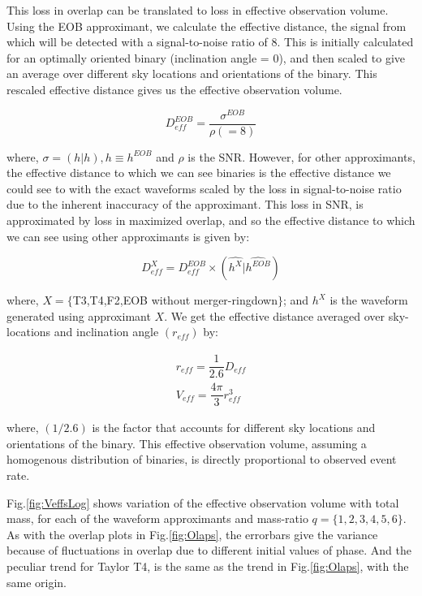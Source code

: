 \documentclass[aps,
prd,
amsmath,
amssymb,
twocolumn,
floatfix,
groupedaddress]{revtex4-1}
\def\l({\left(}
\def\r){\right)}
\begin{document}
This loss in overlap can be translated to loss in effective observation volume. Using the EOB approximant, we calculate the effective distance, the signal from which will be detected with a signal-to-noise ratio of 8. This is initially calculated for an optimally oriented binary (inclination angle = 0), and then scaled to give an average over different sky locations and orientations of the binary. This rescaled effective distance gives us the effective observation volume.

\begin{equation}\label{eq:DeffEOB}
D^{EOB}_{eff} = \dfrac{\sigma^{EOB}}{\rho\l(=8\r)}
\end{equation}

where, $\sigma = \l(h|h\r),h\equiv h^{EOB}$ and $\rho$ is the SNR. However, for other approximants, the effective distance to which we can see binaries is the effective distance we could see to with the exact waveforms scaled by the loss in signal-to-noise ratio due to the inherent inaccuracy of the approximant. This loss in SNR, is approximated by loss in maximized overlap, and so the effective distance to which we can see using other approximants is given by: 

\begin{equation}\label{eq:DeffPN}
D^X_{eff} = D^{EOB}_{eff} \times \l(\hat{h^X}|\hat{h^{EOB}}\r)
\end{equation}

where, $X = \{$T3,T4,F2,EOB without merger-ringdown$\}$; and $h^X$ is the waveform generated using approximant $X$. We get the effective distance averaged over sky-locations and inclination angle $\l(r_{eff}\r)$ by\citep{FinnChernoffDA}:

\begin{align}\label{eq:Veff}
r_{eff} = \dfrac{1}{2.6}D_{eff}\\
V_{eff} = \dfrac{4\pi}{3} r^3_{eff}
\end{align}

where, $(1/2.6)$ is the factor that accounts for different sky locations and orientations of the binary. This effective observation volume, assuming a homogenous distribution of binaries, is directly proportional to observed event rate.

Fig.\ref{fig:VeffsLog} shows variation of the effective observation volume with total mass, for each of the waveform approximants and mass-ratio $q=\{1,2,3,4,5,6\}$. As with the overlap plots in Fig.\ref{fig:Olaps}, the errorbars give the variance because of fluctuations in overlap due to different initial values of phase. And the peculiar trend for Taylor T4, is the same as the trend in Fig.\ref{fig:Olaps}, with the same origin.
\end{document}
